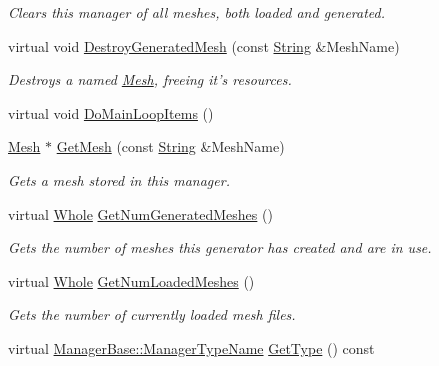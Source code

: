\begin{DoxyCompactItemize}
\begin{DoxyCompactList}\small\item\em Clears this manager of all meshes, both loaded and generated. \item\end{DoxyCompactList}\item 
virtual void \hyperlink{classphys_1_1MeshManager_adabf5507428942f2391b4b96baa4437d}{DestroyGeneratedMesh} (const \hyperlink{namespacephys_aa03900411993de7fbfec4789bc1d392e}{String} \&MeshName)
\begin{DoxyCompactList}\small\item\em Destroys a named \hyperlink{classphys_1_1Mesh}{Mesh}, freeing it's resources. \item\end{DoxyCompactList}\item 
virtual void \hyperlink{classphys_1_1MeshManager_a8c13d3eaa1717c1892012715c46b0818}{DoMainLoopItems} ()
\item 
\hyperlink{classphys_1_1Mesh}{Mesh} $\ast$ \hyperlink{classphys_1_1MeshManager_a04f86b99041edd368fa3ff2d2b84f8d6}{GetMesh} (const \hyperlink{namespacephys_aa03900411993de7fbfec4789bc1d392e}{String} \&MeshName)
\begin{DoxyCompactList}\small\item\em Gets a mesh stored in this manager. \item\end{DoxyCompactList}\item 
virtual \hyperlink{namespacephys_a460f6bc24c8dd347b05e0366ae34f34a}{Whole} \hyperlink{classphys_1_1MeshManager_a45a3fe08d53a70a02d4c1c0e2bbdfde5}{GetNumGeneratedMeshes} ()
\begin{DoxyCompactList}\small\item\em Gets the number of meshes this generator has created and are in use. \item\end{DoxyCompactList}\item 
virtual \hyperlink{namespacephys_a460f6bc24c8dd347b05e0366ae34f34a}{Whole} \hyperlink{classphys_1_1MeshManager_abf24b84f0cc9eac6b707d83436c245c3}{GetNumLoadedMeshes} ()
\begin{DoxyCompactList}\small\item\em Gets the number of currently loaded mesh files. \item\end{DoxyCompactList}\item 
virtual \hyperlink{classphys_1_1ManagerBase_aaa6ccddf23892eaccb898529414f80a5}{ManagerBase::ManagerTypeName} \hyperlink{classphys_1_1MeshManager_ab8d0a416cf9d20940c546adf5b6ebea4}{GetType} () const 

\end{DoxyCompactItemize}
